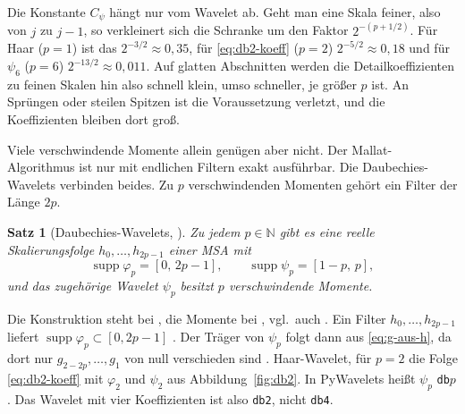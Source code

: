 \documentclass[a4paper,11pt,bibliography=totoc,listof=totoc,headinclude=true,cleardoublepage=empty,oneside]{scrbook}
\theoremstyle{plain}
\newtheorem{Satz}{Satz}[chapter]
\theoremstyle{definition}
\newcommand{\N}{\mathbb{N}}
\DeclareMathOperator{\supp}{supp}
\begin{document}
Die Konstante $C_\psi$ hängt nur vom Wavelet ab. Geht man eine Skala feiner,
also von $j$ zu $j-1$, so verkleinert sich die Schranke um den Faktor
$2^{-(p+1/2)}$. Für Haar ($p=1$) ist das $2^{-3/2}\approx0{,}35$, für
\eqref{eq:db2-koeff} ($p=2$) $2^{-5/2}\approx0{,}18$ und für $\psi_6$
($p=6$) $2^{-13/2}\approx0{,}011$. Auf glatten Abschnitten werden die
Detailkoeffizienten zu feinen Skalen hin also schnell klein, umso schneller,
je grö\ss{}er $p$ ist. An Sprüngen oder steilen Spitzen ist die Voraussetzung
verletzt, und die Koeffizienten bleiben dort gro\ss{}.

Viele verschwindende Momente allein genügen aber nicht. Der Mallat-Algorithmus
ist nur mit endlichen Filtern exakt ausführbar. Die Daubechies-Wavelets
verbinden beides. Zu $p$ verschwindenden Momenten gehört ein Filter der
Länge $2p$.

\begin{Satz}[Daubechies-Wavelets, {\cite[Satz~2.4.22, Bem.~2.4.25, Satz~2.4.28]{lmr}}] %
\label{satz:daubechies}
Zu jedem $p\in\N$ gibt es eine reelle Skalierungsfolge $h_0,\dots,h_{2p-1}$
einer MSA mit
\[
  \supp\varphi_p = [0,\,2p-1], \qquad \supp\psi_p = [1-p,\,p],
\]
und das zugehörige Wavelet $\psi_p$ besitzt $p$ verschwindende Momente.
\end{Satz}

Die Konstruktion steht bei \cite[Kap.~2.4.3]{lmr}, %
die Momente bei \cite[Satz~2.4.28]{lmr}, %
vgl.\ auch \cite[Kap.~6.2]{blatter}. %
Ein Filter $h_0,\dots,h_{2p-1}$ liefert $\supp\varphi_p\subset[0,2p-1]$
\cite[Satz~2.4.9]{lmr}. %
Der Träger von $\psi_p$ folgt dann aus \eqref{eq:g-aus-h}, da dort nur
$g_{2-2p},\dots,g_1$ von null verschieden sind \cite[Gl.~(2.4.13)]{lmr}. %
Haar-Wavelet, für $p=2$ die Folge \eqref{eq:db2-koeff}
\cite[Kap.~6.3]{blatter} %
mit $\varphi_2$ und $\psi_2$ aus Abbildung~\ref{fig:db2}. In PyWavelets
\cite{pywavelets} hei\ss{}t $\psi_p$ \texttt{db}$p$. Das Wavelet mit vier
Koeffizienten ist also \texttt{db2}, nicht \texttt{db4}.
\end{document}
